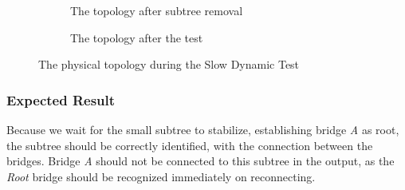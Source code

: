\begin{figure}[hp]
\begin{center}
\begin{subfigure}[b]{0.4\textwidth}
            \caption{The topology after subtree removal}
            \label{fig:sdcTest3}
        \end{subfigure}
        \hspace{1cm}
        \begin{subfigure}[b]{0.4\textwidth}
            \caption{The topology after the test}
            \label{fig:sdcTest5}
       \end{subfigure}
    \end{center}
    \caption{The physical topology during the Slow Dynamic Test}
    \label{fig:sdcTest}
\end{figure}

\subsubsection*{Expected Result}
Because we wait for the small subtree to stabilize, establishing bridge \textit{A} as root, the subtree should be correctly identified, with the connection between the bridges.
Bridge \textit{A} should not be connected to this subtree in the output, as the \textit{Root} bridge should be recognized immediately on reconnecting.

